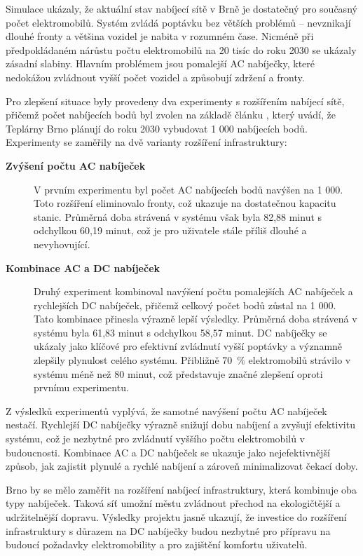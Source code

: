 \documentclass[a4paper,11pt]{article}
\begin{document}
Simulace ukázaly, že aktuální stav nabíjecí sítě v Brně je dostatečný pro současný počet elektromobilů. Systém zvládá poptávku bez větších problémů -- nevznikají dlouhé fronty a většina vozidel je nabita v rozumném čase. Nicméně při předpokládaném nárůstu počtu elektromobilů na 20 tisíc do roku 2030 se ukázaly zásadní slabiny. Hlavním problémem jsou pomalejší AC nabíječky, které nedokážou zvládnout vyšší počet vozidel a způsobují zdržení a fronty.

Pro zlepšení situace byly provedeny dva experimenty s rozšířením nabíjecí sítě, přičemž počet nabíjecích bodů byl zvolen na základě článku \cite{ev_growth}, který uvádí, že Teplárny Brno plánují do roku 2030 vybudovat 1 000 nabíjecích bodů. Experimenty se zaměřily na dvě varianty rozšíření infrastruktury:

\begin{description}
    \item[\textbf{Zvýšení počtu AC nabíječek}] V prvním experimentu byl počet AC nabíjecích bodů navýšen na 1 000. Toto rozšíření eliminovalo fronty, což ukazuje na dostatečnou kapacitu stanic. Průměrná doba strávená v systému však byla 82,88 minut s odchylkou 60,19 minut, což je pro uživatele stále příliš dlouhé a nevyhovující.
    \item[\textbf{Kombinace AC a DC nabíječek}] Druhý experiment kombinoval navýšení počtu pomalejších AC nabíječek a rychlejších DC nabíječek, přičemž celkový počet bodů zůstal na 1 000. Tato kombinace přinesla výrazně lepší výsledky. Průměrná doba strávená v systému byla 61,83 minut s odchylkou 58,57 minut. DC nabíječky se ukázaly jako klíčové pro efektivní zvládnutí vyšší poptávky a významně zlepšily plynulost celého systému. Přibližně 70~\% elektromobilů strávilo v systému méně než 80 minut, což představuje značné zlepšení oproti prvnímu experimentu.
\end{description}

Z výsledků experimentů vyplývá, že samotné navýšení počtu AC nabíječek nestačí. Rychlejší DC nabíječky výrazně snižují dobu nabíjení a zvyšují efektivitu systému, což je nezbytné pro zvládnutí vyššího počtu elektromobilů v budoucnosti. Kombinace AC a DC nabíječek se ukazuje jako nejefektivnější způsob, jak zajistit plynulé a rychlé nabíjení a zároveň minimalizovat čekací doby.

Brno by se mělo zaměřit na rozšíření nabíjecí infrastruktury, která kombinuje oba typy nabíječek. Taková síť umožní městu zvládnout přechod na ekologičtější a udržitelnější dopravu. Výsledky projektu jasně ukazují, že investice do rozšíření infrastruktury s důrazem na DC nabíječky budou nezbytné pro přípravu na budoucí požadavky elektromobility a pro zajištění komfortu uživatelů.

\newpage


\label{sec:zdroje}
\end{document}
